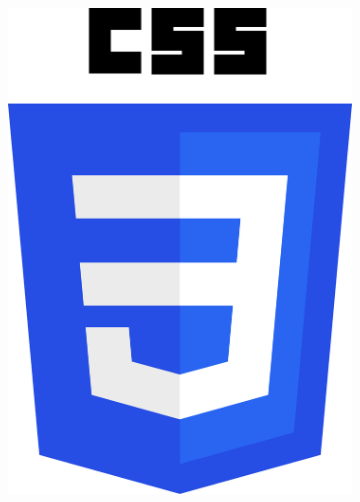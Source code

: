 \begin{figure}[h!]
\begin{subfigure}[b]{0.1\textwidth}
    \includegraphics[width=\textwidth]{Images/CSS3_logo_and_wordmark.svg.png}
    \label{fig:css}
  \end{subfigure}


\end{figure}

